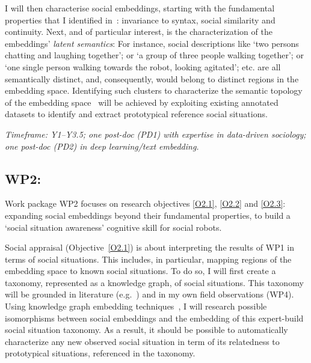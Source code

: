 I will then characterise social embeddings, starting with the fundamental
properties that I identified in~\cite{lemaignan2024social}: invariance to
syntax, social similarity and continuity. Next, and of particular interest, is
the characterization of the embeddings' \emph{latent semantics}: For instance,
social descriptions like `two persons chatting and laughing
together'; or `a group of three people walking together'; or `one single person
walking towards the robot, looking agitated'; etc.  are all semantically
distinct, and, consequently, would belong to distinct regions in the embedding
space. Identifying such clusters to characterize the semantic topology of the
embedding space~\cite{sun2023topological} will be achieved by exploiting
existing annotated datasets to identify and extract prototypical reference social situations.

\vspace{1em}
\noindent\emph{ Timeframe: Y1--Y3.5; one post-doc (PD1) with expertise in
data-driven sociology; one post-doc (PD2) in deep learning/text embedding.}


\subsection{WP2: \textbf{\WPB}} 

Work package WP2 focuses on research objectives \ref{O2.1}, \ref{O2.2} and \ref{O2.3}:
expanding social embeddings beyond their fundamental properties, to build a
`social situation awareness' cognitive skill for social robots.





Social appraisal (Objective~\ref{O2.1}) is about interpreting the results of WP1
in terms of social situations. This includes, in particular, mapping regions of
the embedding space to known social situations. To do so, I will first create a
taxonomy, represented as a knowledge graph, of social situations. This taxonomy
will be grounded in literature (e.g.~\cite{kelley2003atlas}) and in my own field
observations (WP4).  Using knowledge graph embedding
techniques~\cite{ji2022survey}, I will research possible isomorphisms between
social embeddings and the embedding of this expert-build social situation
taxonomy. As a result, it should be possible to automatically characterize any
new observed social situation in term of its relatedness to prototypical
situations, referenced in the taxonomy.

